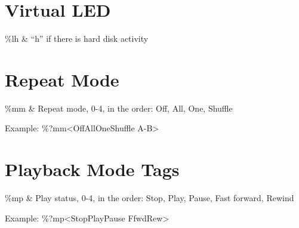 
\section{Virtual LED}
  \begin{tagmap}{}{}
    \%lh & ``h'' if there is hard disk activity\\
  \end{tagmap}

\section{Repeat Mode}
  \begin{tagmap}{}{}
    \%mm & Repeat mode, 0-4, in the order: Off, All, One, Shuffle
           \\
  \end{tagmap}
Example: \%?mm{\textless}Off{\textbar}All{\textbar}One{\textbar}Shuffle%
{\textbar}A-B{\textgreater}

\section{Playback Mode Tags}
  \begin{tagmap}{}{}
    \%mp & Play status, 0-4, in the order: Stop, Play, Pause, 
           Fast forward, Rewind\\
  \end{tagmap}
Example: \%?mp{\textless}Stop{\textbar}Play{\textbar}Pause{\textbar}%
Ffwd{\textbar}Rew{\textgreater}

